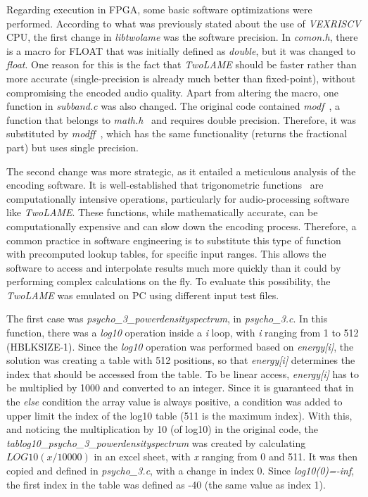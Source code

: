 Regarding execution in FPGA, some basic software optimizations were performed.
According to what was previously stated about the use of \textit{VEXRISCV} CPU, the first change in \textit{libtwolame} was the software precision. In \textit{comon.h}, there is a macro for FLOAT that was initially defined as \textit{double}, but it was changed to \textit{float}. One reason for this is the fact that \textit{TwoLAME} should be faster rather than more accurate (single-precision is already much better than fixed-point), without compromising the encoded audio quality.
Apart from altering the macro, one function in \textit{subband.c} was also changed. The original code contained \textit{modf}~\cite{modf}, a function that belongs to \textit{math.h}~\cite{mathh} and requires double precision. Therefore, it was substituted by \textit{modff}~\cite{modf}, which has the same functionality (returns the fractional part) but uses single precision.

The second change was more strategic, as it entailed a meticulous analysis of the encoding software. It is well-established that trigonometric functions~\cite{trigonometric} are computationally intensive operations, particularly for audio-processing software like \textit{TwoLAME}. These functions, while mathematically accurate, can be computationally expensive and can slow down the encoding process. Therefore, a common practice in software engineering is to substitute this type of function with precomputed lookup tables, for specific input ranges. This allows the software to access and interpolate results much more quickly than it could by performing complex calculations on the fly. 
To evaluate this possibility, the \textit{TwoLAME} was emulated on PC using different input test files.

The first case was \textit{psycho\_3\_powerdensityspectrum}, in \textit{psycho\_3.c}. In this function, there was a \textit{log10} operation inside a \textit{i} loop, with \textit{i} ranging from 1 to 512 (HBLKSIZE-1). Since the \textit{log10} operation was performed based on \textit{energy[i]}, the solution was creating a table with 512 positions, so that \textit{energy[i]} determines the index that should be accessed from the table. To be linear access, \textit{energy[i]} has to be multiplied by 1000 and converted to an integer. Since it is guaranteed that in the \textit{else} condition the array value is always positive, a condition was added to upper limit the index of the log10 table (511 is the maximum index). With this, and noticing the multiplication by 10 (of log10) in the original code, the \textit{tablog10\_psycho\_3\_powerdensityspectrum} was created by calculating $LOG10(x/10000)$ in an excel sheet, with \textit{x} ranging from 0 and 511. It was then copied and defined in \textit{psycho\_3.c}, with a change in index 0. Since \textit{log10(0)=-inf}, the first index in the table was defined as -40 (the same value as index 1).

